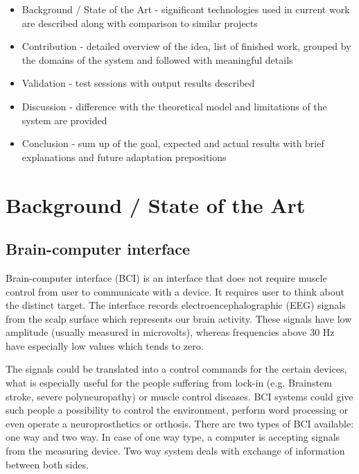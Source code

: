 \documentclass[12pt]{article}
\begin{document}
\begin{itemize}
\item Background / State of the Art - significant technologies used in current work are described along with comparison to similar projects
\item Contribution - detailed overview of the idea, list of finished work, grouped by the domains of the system and followed with meaningful details
\item Validation - test sessions with output results described
\item Discussion - difference with the theoretical model and limitations of the system are provided
\item Conclusion - sum up of the goal, expected and actual results with brief explanations and future adaptation prepositions
\end{itemize}

\newpage
\section{Background / State of the Art} 
\subsection{Brain-computer interface}

Brain-computer interface (BCI) is an interface that does not require muscle control from user to communicate with a device. It requires user to think about the distinct target. The interface records electroencephalographic (EEG) signals from the scalp surface which represents our brain activity. These signals have low amplitude (usually measured in microvolts), whereas frequencies above 30 Hz have especially low values which tends to zero.\cite{bci_vidal}

The signals could be translated into a control commands for the certain devices, what is especially useful for the people suffering from lock-in (e.g. Brainstem stroke, severe polyneuropathy) or muscle control diseases.  BCI systems could give such people a possibility to control the environment, perform word processing or even operate a neuroprosthetics or orthosis.
There are two types of BCI available: one way and two way. In case of one way type, a computer is accepting signals from the measuring device. Two way system deals with exchange of information between both sides.\cite{bci_shivangi}
\end{document}
